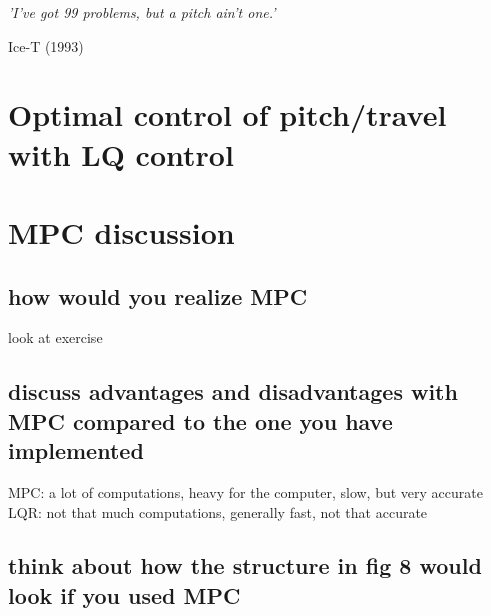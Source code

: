 \epigraph{\textit{'I've got 99 problems, but a pitch ain't one.'}}{Ice-T (1993)}
\section{Optimal control of pitch/travel with LQ control}

\section{MPC discussion}

\subsection{how would you realize MPC}
look at exercise 

\subsection{discuss advantages and disadvantages with MPC compared to the one you have implemented}
MPC: a lot of computations, heavy for the computer, slow, but very accurate
LQR: not that much computations, generally fast, not that accurate

\subsection{think about how the structure in fig 8 would look if you used MPC}